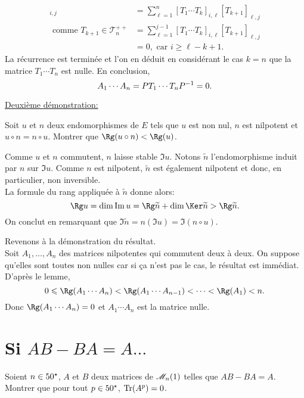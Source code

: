 \begin{solution}
\begin{enumerate}
\begin{itemize}
\begin{align*}
                [T_1 \cdots T_{k+1}]_{i,j} &= \sum_{\ell=1}^n [T_1 \cdots T_k]_{i, \ell} [T_{k+1}]_{\ell, j} \\
                \text{ comme } T_{k+1} \in \mathscr{T}_n^{++} &= \sum_{\ell=1}^{j-1} [T_1 \cdots T_k]_{i, \ell} [T_{k+1}]_{\ell, j} \\
                &= 0, \text{ car } i \geqslant \ell - k +1.
            \end{align*}
            La récurrence est terminée et l'on en déduit en considérant le cas $k = n$ que la matrice $T_1 \cdots T_n$ est nulle. En conclusion,
            $$A_1 \cdots A_n = P T_1 \cdots T_n P^{-1} = 0.$$
        \end{itemize}
        \underline{Deuxième démonstration:} \\
        \begin{lemme}
            Soit $u$ et $n$ deux endomorphismes de $E$ tels que $u$ est non nul, $n$ est nilpotent et $u \circ n = n \circ u$. Montrer que $\Rg(u \circ n) < \Rg(u)$.
        \end{lemme}
        \begin{demo}
            Comme $u$ et $n$ commutent, $n$ laisse stable $\Im u$. Notons $\widetilde{n}$ l'endomorphisme induit par $n$ sur $\Im u$. Comme $n$ est nilpotent, $\widetilde{n}$ est également nilpotent et donc, en particulier, non inversible. \\
            La formule du rang appliquée à $\widetilde{n}$ donne alors:
            $$\Rg u = \dim \Im u = \Rg \widetilde{n} + \dim \Ker \widetilde{n} > \Rg \widetilde{n}.$$
            On conclut en remarquant que $\Im \widetilde{n} = n(\Im u) = \Im (n \circ u)$.
        \end{demo}
    \end{enumerate}
    Revenons à la démonstration du résultat. \\
    Soit $A_1, \dots, A_n$ des matrices nilpotentes qui commutent deux à deux. On suppose qu'elles sont toutes non nulles car si ça n'est pas le cas, le résultat est immédiat. \\
    D'après le lemme,
    $$0 \leqslant \Rg(A_1 \cdots A_n) < \Rg(A_1 \cdots A_{n-1}) < \cdots < \Rg(A_1) < n.$$
    Donc $\Rg(A_1 \cdots A_n) = 0$ et $A_1 \cdots A_n$ est la matrice nulle.
\end{solution}


\section{Si \texorpdfstring{$AB - BA = A \dots$}{AB-BA=A...}}
\begin{exercice}
    Soient $n \in 50^\star$, $A$ et $B$ deux matrices de $\mathscr{M}_n(1)$ telles que $AB - BA = A$. Montrer que pour tout $p \in 50^\star$, $\Tr(A^p) = 0$.
\end{exercice}

